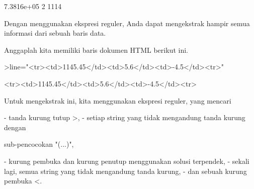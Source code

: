 \documentclass[12pt,arial,letterpaper]{book}
\begin{document}
\begin{eulernootebook}
\begin{eulercomment}
\begin{eulercomment}
\begin{eulernootebook}
\begin{eulercomment}
\begin{eulercomment}
\begin{eulercomment}
\begin{eulercomment}
\begin{eulercomment}
\begin{eulercomment}
\begin{eulercomment}
\begin{eulercomment}
\begin{eulercomment}
\begin{eulercomment}
\begin{eulercomment}
\begin{eulercomment}
\begin{eulercomment}
\begin{eulerprompt}
\end{eulerprompt}
\begin{euleroutput}
  7.3816e+05
  2
  1114
\end{euleroutput}
\begin{eulercomment}
Dengan menggunakan ekspresi reguler, Anda dapat mengekstrak hampir
semua informasi dari sebuah baris data.

Anggaplah kita memiliki baris dokumen HTML berikut ini.
\end{eulercomment}
\begin{eulerprompt}
>line="<tr><td>1145.45</td><td>5.6</td><td>-4.5</td><tr>"
\end{eulerprompt}
\begin{euleroutput}
  <tr><td>1145.45</td><td>5.6</td><td>-4.5</td><tr>
\end{euleroutput}
\begin{eulercomment}
Untuk mengekstrak ini, kita menggunakan ekspresi reguler, yang mencari

\end{eulercomment}
\begin{eulerttcomment}
 - tanda kurung tutup >,
 - setiap string yang tidak mengandung tanda kurung dengan
\end{eulerttcomment}
\begin{eulercomment}
sub-pencocokan "(...)",\\
\end{eulercomment}
\begin{eulerttcomment}
 - kurung pembuka dan kurung penutup menggunakan solusi terpendek,
 - sekali lagi, semua string yang tidak mengandung tanda kurung,
 - dan sebuah kurung pembuka <.
\end{eulerttcomment}
\begin{eulercomment}


\end{eulercomment}
\end{eulercomment}
\end{eulercomment}
\end{eulercomment}
\end{eulercomment}
\end{eulercomment}
\end{eulercomment}
\end{eulercomment}
\end{eulercomment}
\end{eulercomment}
\end{eulercomment}
\end{eulercomment}
\end{eulercomment}
\end{eulercomment}
\end{eulernootebook}
\end{eulercomment}
\end{eulercomment}
\end{eulernootebook}
\end{document}
